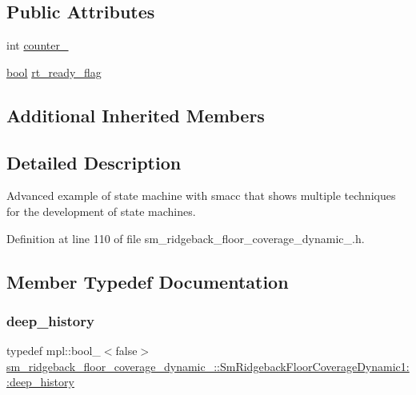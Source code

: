 \subsection*{Public Attributes}
\begin{DoxyCompactItemize}
\item 
int \hyperlink{structsm__ridgeback__floor__coverage__dynamic__1_1_1SmRidgebackFloorCoverageDynamic1_aa47eb8f17a6730dcae3a8be34510f8bf}{counter\+\_}
\item 
\hyperlink{classbool}{bool} \hyperlink{structsm__ridgeback__floor__coverage__dynamic__1_1_1SmRidgebackFloorCoverageDynamic1_aa54392c38d6cbe8a6637f94a85293949}{rt\+\_\+ready\+\_\+flag}
\end{DoxyCompactItemize}
\subsection*{Additional Inherited Members}


\subsection{Detailed Description}
Advanced example of state machine with smacc that shows multiple techniques for the development of state machines. 

Definition at line 110 of file sm\+\_\+ridgeback\+\_\+floor\+\_\+coverage\+\_\+dynamic\+\_.\+h.



\subsection{Member Typedef Documentation}
\mbox{\label{structsm__ridgeback__floor__coverage__dynamic__1_1_1SmRidgebackFloorCoverageDynamic1_a41107df9b45049b5095afccc0d5f2780}} 
\subsubsection{\texorpdfstring{deep\+\_\+history}{deep\_history}}
{\footnotesize\ttfamily typedef mpl\+::bool\+\_\+$<$false$>$ \hyperlink{structsm__ridgeback__floor__coverage__dynamic__1_1_1SmRidgebackFloorCoverageDynamic1_a41107df9b45049b5095afccc0d5f2780}{sm\+\_\+ridgeback\+\_\+floor\+\_\+coverage\+\_\+dynamic\+\_\+::\+Sm\+Ridgeback\+Floor\+Coverage\+Dynamic1\+::deep\+\_\+history}}



